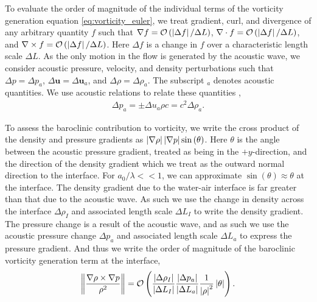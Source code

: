 To evaluate the order of magnitude of the individual terms of the
vorticity generation equation \eqref{eq:vorticity_euler}, we treat
gradient, curl, and divergence of any arbitrary quantity $f$ such that
$\nabla f= \mathcal{O}\left(\left|\Delta f\right|/\Delta L\right)$,
$\nabla\cdot f=\mathcal{O}\left(\left|\Delta f\right|/\Delta L\right)$, and
$\nabla\times f=\mathcal{O}\left(\left|\Delta f\right|/\Delta L\right)$. Here
$\Delta f$ is a change in $f$ over a characteristic length scale
$\Delta L$. As the only motion in the flow is generated by the
acoustic wave, we consider acoustic pressure, velocity, and density
perturbations such that $\Delta p=\Delta p_a$,
$\Delta \boldsymbol{u}=\Delta \boldsymbol{u}_a$, and
$\Delta \rho=\Delta \rho_a$. The subscript $_a$ denotes acoustic
quantities. We use acoustic relations to relate these quantities
\citep{Anderson1990},
\begin{align}%
  \label{eq:acoustic_relations}%
  \Delta p_a=\pm\Delta u_a \rho c=c^2\Delta \rho_a.%
\end{align}

To assess the baroclinic contribution to vorticity, we write the cross
product of the density and pressure gradients as
$\left|\nabla \rho\right| \left|\nabla p\right| \sin{\left(\theta\right)}$. Here
$\theta$ is the angle between the acoustic pressure gradient, treated
as being in the $\plus y$-direction, and the direction of the density
gradient which we treat as the outward normal direction to the
interface. For $a_0/\lambda<<1$, we can approximate
$\sin{\left(\theta\right)}\approx\theta$ at the interface. The density
gradient due to the water-air interface is far greater than that due
to the acoustic wave. As such we use the change in density across the
interface $\Delta \rho_I$ and associated length scale $\Delta L_I$ to
write the density gradient. The pressure change is a result of the
acoustic wave, and as such we use the acoustic pressure change
$\Delta p_a$ and associated length scale $\Delta L_a$ to express the
pressure gradient. And thus we write the order of magnitude of the
baroclinic vorticity generation term at the interface,
\begin{align}
  \label{eq:baroclinic_vorticity}%
  \norm{\frac{\nabla\rho\times\nabla p}{\rho^2}} =%
  \orderof{\frac{\abs{\Delta \rho_I}}{\abs{\Delta L_I}}\frac{\abs{\Delta p_a}}{\abs{\Delta L_a}}\frac{1}{\abs{\rho}^2}\abs{\theta}}.%
\end{align}

